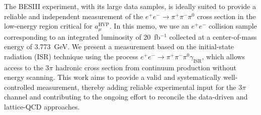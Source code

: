 The BESIII experiment, with its large data samples, is ideally suited to provide a reliable and independent measurement of the \(e^+e^- \to \pi^+\pi^-\pi^0\) cross section in the low-energy region critical for \(a_\mu^{\mathrm{HVP}}\). In this memo, we use an \(e^+e^-\) collision sample corresponding to an integrated luminosity of 20~fb\(^{-1}\) collected at a center-of-mass energy of 3.773~GeV. We present a measurement based on the initial-state radiation (ISR) technique using the process \(e^+e^- \to \pi^+\pi^-\pi^0 \gamma_{\mathrm{ISR}}\), which allows access to the \(3\pi\) hadronic cross section from continuum production without energy scanning. This work aims to provide a valid and systematically well-controlled measurement, thereby adding reliable experimental input for the \(3\pi\) channel and contributing to the ongoing effort to reconcile the data-driven and lattice-QCD approaches.